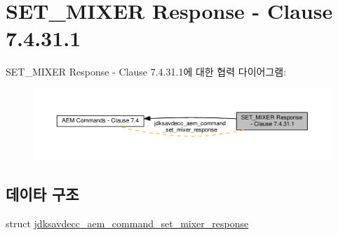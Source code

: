 \hypertarget{group__command__set__mixer__response}{}\section{S\+E\+T\+\_\+\+M\+I\+X\+ER Response -\/ Clause 7.4.31.1}
\label{group__command__set__mixer__response}
S\+E\+T\+\_\+\+M\+I\+X\+ER Response -\/ Clause 7.4.31.1에 대한 협력 다이어그램\+:
\nopagebreak
\begin{figure}[H]
\begin{center}
\leavevmode
\includegraphics[width=350pt]{group__command__set__mixer__response}
\end{center}
\end{figure}
\subsection*{데이타 구조}
\begin{DoxyCompactItemize}
\item 
struct \hyperlink{structjdksavdecc__aem__command__set__mixer__response}{jdksavdecc\+\_\+aem\+\_\+command\+\_\+set\+\_\+mixer\+\_\+response}
\end{DoxyCompactItemize}
